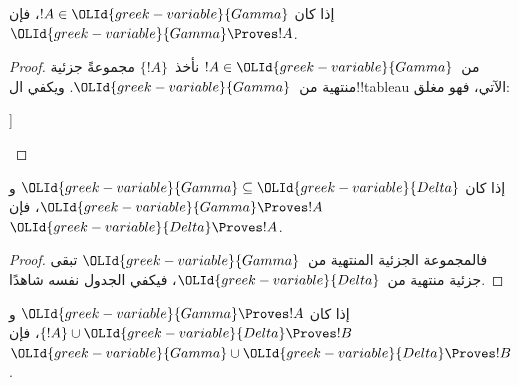 \documentclass[../../../include/open-logic-section]{subfiles}
\begin{document}
\begin{prop}[الانعكاسية]
إذا كان $!A \in \OLId{greek-variable}{Gamma}$، فإن $\OLId{greek-variable}{Gamma} \Proves !A$.
\end{prop}

\begin{proof}
من~$!A \in \OLId{greek-variable}{Gamma}$ نأخذ~$\{!A\}$ مجموعةً جزئية منتهية
من~$\OLId{greek-variable}{Gamma}$. ويكفي ال!!{tableau} الآتي، فهو مغلق:
\begin{oltableau}
  [\sFmla{\False}{\formula{A}}, just = \TAss
    [\sFmla{\True}{\formula{A}}, just = \TAss,close]
  ]
\end{oltableau}
\end{proof}
  

\begin{prop}[الرتابة]
إذا كان $\OLId{greek-variable}{Gamma} \subseteq \OLId{greek-variable}{Delta}$ و$\OLId{greek-variable}{Gamma} \Proves !A$، فإن $\OLId{greek-variable}{Delta}
\Proves !A$.
\end{prop}

\begin{proof}
فالمجموعة الجزئية المنتهية من~$\OLId{greek-variable}{Gamma}$ تبقى جزئية منتهية من~$\OLId{greek-variable}{Delta}$،
فيكفي الجدول نفسه شاهدًا.
\end{proof}

\begin{prop}[التعدية]
إذا كان $\OLId{greek-variable}{Gamma} \Proves !A$ و$\{!A\} \cup
\OLId{greek-variable}{Delta} \Proves !B$، فإن $\OLId{greek-variable}{Gamma} \cup \OLId{greek-variable}{Delta} \Proves !B$.
\end{prop}
\end{document}
